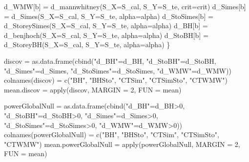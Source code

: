 \documentclass[
]{article}
\newenvironment{Shaded}{\begin{snugshade}}{\end{snugshade}}
\newcommand{\AttributeTok}[1]{\textcolor[rgb]{0.77,0.63,0.00}{#1}}
\newcommand{\DecValTok}[1]{\textcolor[rgb]{0.00,0.00,0.81}{#1}}
\newcommand{\FunctionTok}[1]{\textcolor[rgb]{0.00,0.00,0.00}{#1}}
\newcommand{\NormalTok}[1]{#1}
\newcommand{\OtherTok}[1]{\textcolor[rgb]{0.56,0.35,0.01}{#1}}
\newcommand{\SpecialCharTok}[1]{\textcolor[rgb]{0.00,0.00,0.00}{#1}}
\newcommand{\StringTok}[1]{\textcolor[rgb]{0.31,0.60,0.02}{#1}}
\begin{document}
\begin{Shaded}
\begin{Highlighting}[]
\NormalTok{    d\_WMW[b] }\OtherTok{=} \FunctionTok{d\_mannwhitney}\NormalTok{(}\AttributeTok{S\_X=}\NormalTok{S\_cal, }\AttributeTok{S\_Y=}\NormalTok{S\_te, }\AttributeTok{crit=}\NormalTok{crit)}
\NormalTok{    d\_Simes[b] }\OtherTok{=} \FunctionTok{d\_Simes}\NormalTok{(}\AttributeTok{S\_X=}\NormalTok{S\_cal, }\AttributeTok{S\_Y=}\NormalTok{S\_te, }\AttributeTok{alpha=}\NormalTok{alpha)}
\NormalTok{    d\_StoSimes[b] }\OtherTok{=} \FunctionTok{d\_StoreySimes}\NormalTok{(}\AttributeTok{S\_X=}\NormalTok{S\_cal, }\AttributeTok{S\_Y=}\NormalTok{S\_te, }\AttributeTok{alpha=}\NormalTok{alpha)}
\NormalTok{    d\_BH[b] }\OtherTok{=} \FunctionTok{d\_benjhoch}\NormalTok{(}\AttributeTok{S\_X=}\NormalTok{S\_cal, }\AttributeTok{S\_Y=}\NormalTok{S\_te, }\AttributeTok{alpha=}\NormalTok{alpha)}
\NormalTok{    d\_StoBH[b] }\OtherTok{=} \FunctionTok{d\_StoreyBH}\NormalTok{(}\AttributeTok{S\_X=}\NormalTok{S\_cal, }\AttributeTok{S\_Y=}\NormalTok{S\_te, }\AttributeTok{alpha=}\NormalTok{alpha)}
\NormalTok{  \}}

\NormalTok{  discov }\OtherTok{=} \FunctionTok{as.data.frame}\NormalTok{(}\FunctionTok{cbind}\NormalTok{(}\StringTok{"d\_BH"}\OtherTok{=}\NormalTok{d\_BH, }\StringTok{"d\_StoBH"}\OtherTok{=}\NormalTok{d\_StoBH, }\StringTok{"d\_Simes"}\OtherTok{=}\NormalTok{d\_Simes,}
                               \StringTok{"d\_StoSimes"}\OtherTok{=}\NormalTok{d\_StoSimes, }\StringTok{"d\_WMW"}\OtherTok{=}\NormalTok{d\_WMW))}
  \FunctionTok{colnames}\NormalTok{(discov) }\OtherTok{=} \FunctionTok{c}\NormalTok{(}\StringTok{"BH"}\NormalTok{, }\StringTok{"BHSto"}\NormalTok{, }\StringTok{"CTSim"}\NormalTok{, }\StringTok{"CTSimSto"}\NormalTok{, }\StringTok{"CTWMW"}\NormalTok{)}
\NormalTok{  mean.discov }\OtherTok{=} \FunctionTok{apply}\NormalTok{(discov, }\AttributeTok{MARGIN =} \DecValTok{2}\NormalTok{, }\AttributeTok{FUN =}\NormalTok{ mean)}
  
\NormalTok{  powerGlobalNull }\OtherTok{=} \FunctionTok{as.data.frame}\NormalTok{(}\FunctionTok{cbind}\NormalTok{(}\StringTok{"d\_BH"}\OtherTok{=}\NormalTok{d\_BH}\SpecialCharTok{\textgreater{}}\DecValTok{0}\NormalTok{, }\StringTok{"d\_StoBH"}\OtherTok{=}\NormalTok{d\_StoBH}\SpecialCharTok{\textgreater{}}\DecValTok{0}\NormalTok{, }\StringTok{"d\_Simes"}\OtherTok{=}\NormalTok{d\_Simes}\SpecialCharTok{\textgreater{}}\DecValTok{0}\NormalTok{,}
                               \StringTok{"d\_StoSimes"}\OtherTok{=}\NormalTok{d\_StoSimes}\SpecialCharTok{\textgreater{}}\DecValTok{0}\NormalTok{, }\StringTok{"d\_WMW"}\OtherTok{=}\NormalTok{d\_WMW}\SpecialCharTok{\textgreater{}}\DecValTok{0}\NormalTok{))}
  \FunctionTok{colnames}\NormalTok{(powerGlobalNull) }\OtherTok{=} \FunctionTok{c}\NormalTok{(}\StringTok{"BH"}\NormalTok{, }\StringTok{"BHSto"}\NormalTok{, }\StringTok{"CTSim"}\NormalTok{, }\StringTok{"CTSimSto"}\NormalTok{, }\StringTok{"CTWMW"}\NormalTok{)}
\NormalTok{  mean.powerGlobalNull }\OtherTok{=} \FunctionTok{apply}\NormalTok{(powerGlobalNull, }\AttributeTok{MARGIN =} \DecValTok{2}\NormalTok{, }\AttributeTok{FUN =}\NormalTok{ mean)}


\end{Highlighting}
\end{Shaded}
\end{document}
